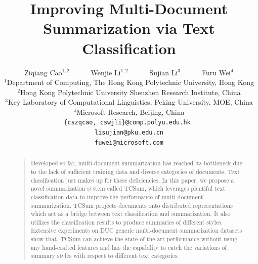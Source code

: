 \documentclass[letterpaper]{article}
\begin{document}
\title{Improving Multi-Document Summarization via Text Classification }
\author{
Ziqiang Cao$^{1,2}$ ~~ ~~ Wenjie Li$^{1,2}$ ~~ ~~ Sujian Li$^3$ ~~ ~~ Furu Wei$^4$\\
$^1$Department of Computing, The Hong Kong Polytechnic University, Hong Kong\\
$^2$Hong Kong Polytechnic University Shenzhen Research Institute, China\\
$^3$Key Laboratory of Computational Linguistics, Peking University, MOE, China \\
$^4$Microsoft Research, Beijing, China\\
{\tt \{cszqcao, cswjli\}@comp.polyu.edu.hk  } \\
{\tt lisujian@pku.edu.cn} \\
{\tt fuwei@microsoft.com} \\
}
\maketitle
\begin{abstract}
\begin{quote}
Developed so far, multi-document summarization has reached its bottleneck due to the lack of sufficient training data and diverse categories of documents.
Text classification just makes up for these deficiencies.
In this paper, we propose a novel summarization system called TCSum, which leverages plentiful text classification data to improve the performance of multi-document summarization.
TCSum projects documents onto distributed representations which act as a bridge between text classification and summarization.
It also utilizes the classification results to produce summaries of different styles.
Extensive experiments on DUC generic multi-document summarization datasets show that, TCSum can achieve the state-of-the-art performance without using any hand-crafted features and has the capability to catch the variations of summary styles with respect to different text categories.
\end{quote}
\end{abstract}
\end{document}
